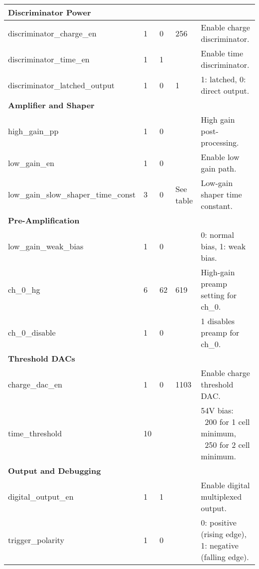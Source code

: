\begin{longtable}{|l|l|l|l|p{6cm}|}
    \textbf{Discriminator Power} & & & & \\ \hline
    discriminator\_charge\_en  & 1  & 0  & 256     & Enable charge discriminator. \\ \hline
    discriminator\_time\_en    & 1  & 1  &         & Enable time discriminator. \\ \hline
    discriminator\_latched\_output & 1 & 0 & 1   & 1: latched, 0: direct output. \\ \hline
    
    \textbf{Amplifier and Shaper} & & & & \\ \hline
    high\_gain\_pp       & 1  & 0  &         & High gain post-processing. \\ \hline
    low\_gain\_en        & 1  & 0  &         & Enable low gain path. \\ \hline
    low\_gain\_slow\_shaper\_time\_const & 3 & 0 & See table & Low-gain shaper time constant. \\ \hline
    
    \textbf{Pre-Amplification} & & & & \\ \hline
    low\_gain\_weak\_bias & 1  & 0  &         & 0: normal bias, 1: weak bias. \\ \hline
    ch\_0\_hg            & 6  & 62 & 619     & High-gain preamp setting for ch\_0. \\ \hline
    ch\_0\_disable       & 1  & 0  &         & 1 disables preamp for ch\_0. \\ \hline
    
    \textbf{Threshold DACs} & & & & \\ \hline
    charge\_dac\_en      & 1  & 0  & 1103    & Enable charge threshold DAC. \\ \hline
    time\_threshold      & 10 &    &         & 54V bias: ~200 for 1 cell minimum, ~250 for 2 cell minimum. \\ \hline
    
    \textbf{Output and Debugging} & & & & \\ \hline
    digital\_output\_en  & 1  & 1  &         & Enable digital multiplexed output. \\ \hline
    trigger\_polarity    & 1  & 0  &         & 0: positive (rising edge), 1: negative (falling edge). \\ \hline
    
    \end{longtable}


